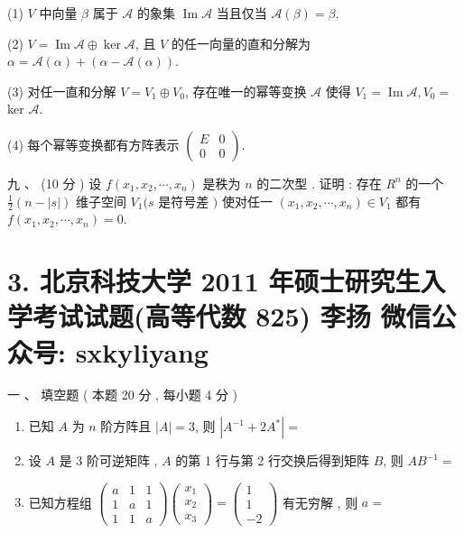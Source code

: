 \documentclass[10pt]{article}
\begin{document}
{(1) $V$  中向量  $\beta$  属于  $\mathscr{A}$  的象集  $\operatorname{Im} \mathscr{A}$  当且仅当  $\mathscr{A}(\beta)=\beta$.

(2) $V=\operatorname{Im} \mathscr{A} \oplus \operatorname{ker} \mathscr{A}$,  且  $V$  的任一向量的直和分解为  $\alpha=\mathscr{A}(\alpha)+(\alpha-\mathscr{A}(\alpha))$.

(3)  对任一直和分解  $V=V_{1} \oplus V_{0}$,  存在唯一的幂等变换  $\mathscr{A}$  使得  $V_{1}=\operatorname{Im} \mathscr{A}, V_{0}=$ ker $\mathscr{A}$.

(4)  每个幂等变换都有方阵表示  $\left(\begin{array}{cc}E & 0 \\ 0 & 0\end{array}\right)$.

 九 、 (10  分 )  设  $f\left(x_{1}, x_{2}, \cdots, x_{n}\right)$  是秩为  $n$  的二次型 .  证明 :  存在  $R^{n}$  的一个  $\frac{1}{2}(n-|s|)$  维子空间  $V_{1}(s$  是符号差  $)$  使对任一  $\left(x_{1}, x_{2}, \cdots, x_{n}\right) \in V_{1}$  都有  $f\left(x_{1}, x_{2}, \cdots, x_{n}\right)=0$.

\section{3. 北京科技大学 2011 年硕士研究生入学考试试题(高等代数 825) 
 李扬 
 微信公众号: sxkyliyang}
 一 、 填空题 ( 本题  20  分 ,  每小题  4  分 )

\begin{enumerate}
  \item  已知  $A$  为  $n$  阶方阵且  $|A|=3$,  则  $\left|A^{-1}+2 A^{*}\right|=$

  \item  设  $A$  是  3  阶可逆矩阵 , $A$  的第  1  行与第  2  行交换后得到矩阵  $B$,  则  $A B^{-1}=$

  \item  已知方程组  $\left(\begin{array}{lll}a & 1 & 1 \\ 1 & a & 1 \\ 1 & 1 & a\end{array}\right)\left(\begin{array}{l}x_{1} \\ x_{2} \\ x_{3}\end{array}\right)=\left(\begin{array}{c}1 \\ 1 \\ -2\end{array}\right)$  有无穷解 ,  则  $a=$


\end{enumerate}}
\end{document}
